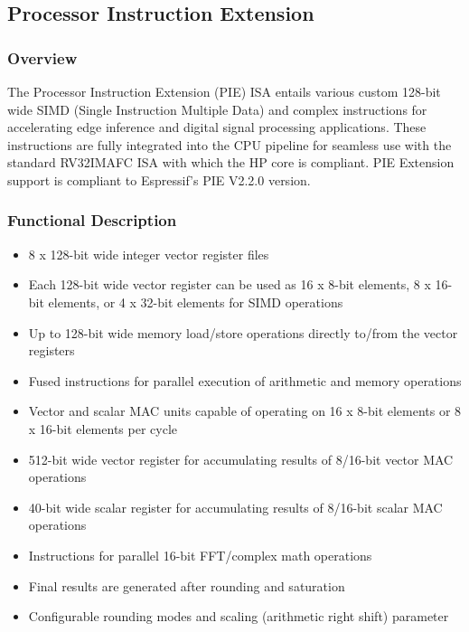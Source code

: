 \documentclass[main\_\_EN.tex]{subfiles}
\begin{document}

\newpage
\subsection{Processor Instruction Extension}
\label{sec:riscvcpu-pie}

\subsubsection{Overview}
\label{sec:riscvcpu-pie-overview}

The Processor Instruction Extension (PIE) ISA entails various custom 128-bit wide SIMD (Single Instruction Multiple Data) and complex instructions for accelerating edge inference and digital signal processing applications. These instructions are fully integrated into the CPU pipeline for seamless use with the standard RV32IMAFC ISA with which the HP core is compliant. PIE Extension support is compliant to Espressif's PIE V2.2.0 version.

\subsubsection{Functional Description}
\label{sec:riscvcpu-pie-func-descr}

\begin{itemize}
    \item 8 x 128-bit wide integer vector register files
    \item Each 128-bit wide vector register can be used as 16 x 8-bit elements, 8 x 16-bit elements, or 4 x 32-bit elements for SIMD operations
    \item Up to 128-bit wide memory load/store operations directly to/from the vector registers
    \item Fused instructions for parallel execution of arithmetic and memory operations
    \item Vector and scalar MAC units capable of operating on 16 x 8-bit elements or 8 x 16-bit elements per cycle
    \item 512-bit wide vector register for accumulating results of 8/16-bit vector MAC operations
    \item 40-bit wide scalar register for accumulating results of 8/16-bit scalar MAC operations
    \item Instructions for parallel 16-bit FFT/complex math operations
    \item Final results are generated after rounding and saturation
    \item Configurable rounding modes and scaling (arithmetic right shift) parameter
\end{itemize}
\end{document}
